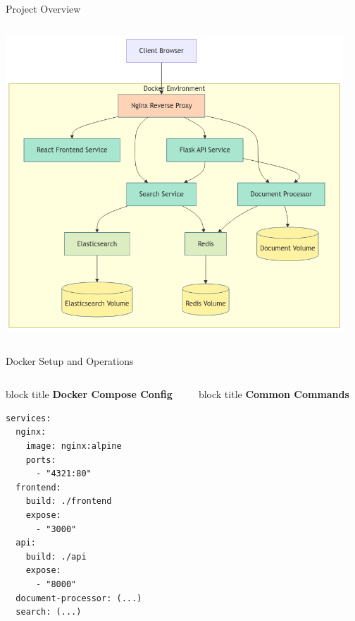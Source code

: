 \documentclass[notes]{beamer}
\begin{document}
{\begin{frame}{Project Overview}
\begin{columns}[T]
\begin{column}{0.62\textwidth}
        \vspace{0.5cm}  %
        \includegraphics[width=0.95\textwidth,height=0.7\textheight,keepaspectratio]{systemarch.png}
    \end{column}
  \end{columns}
\end{frame}

\begin{frame}[fragile]{Docker Setup and Operations}
  \begin{columns}[T] %
    \begin{column}{0.48\textwidth} %
      \begin{beamercolorbox}[shadow=true,rounded=true]{block title}
        \centering\textbf{Docker Compose Config}
      \end{beamercolorbox}
        \begin{verbatim}
services:
  nginx:
    image: nginx:alpine
    ports:
      - "4321:80"
  frontend:
    build: ./frontend
    expose:
      - "3000"
  api:
    build: ./api
    expose:
      - "8000"
  document-processor: (...)
  search: (...)
        \end{verbatim}
    \end{column}
    
    \hspace{0.5em} %
    
    \begin{column}{0.48\textwidth}
      \begin{beamercolorbox}[shadow=true,rounded=true]{block title}
        \centering\textbf{Common Commands}
      \end{beamercolorbox}


\end{column}
\end{columns}
\end{frame}}
\end{document}

